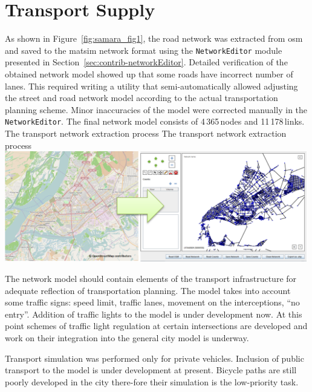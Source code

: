 \section{Transport Supply}
As shown in Figure~\ref{fig:samara_fig1}, the road network was extracted from \gls{osm} and saved to the \gls{matsim} network format using the \lstinline|NetworkEditor| module presented in Section~\ref{sec:contrib-networkEditor}. 
Detailed verification of the obtained network model showed up that some roads have incorrect number of lanes. This required writing a utility that semi-automatically allowed adjusting the street and road network model according to the actual transportation planning scheme. Minor inaccuracies of the model were corrected manually in the \lstinline|NetworkEditor|. The final network model consists of 4\,365\,nodes and 11\,178\,links.
%
\createfigure%
{The transport network extraction process}%
{The transport network extraction process}%
{\label{fig:samara_fig1}}%
{\includegraphics[width=0.99\textwidth, angle=0]{./scenarios/figures/samara_fig1.png}}%
{}

The network model should contain elements of the transport infrastructure for adequate reflection of transportation planning. The model takes into account some traffic signs: speed limit, traffic lanes, movement on the interceptions, ``no entry''. Addition of traffic lights to the model is under development now. At this point schemes of traffic light regulation at certain intersections are developed and work on their integration into the general city model is underway.

Transport simulation was performed only for private vehicles. Inclusion of public transport to the model is under development at present. Bicycle paths are still poorly developed in the city there-fore their simulation is the low-priority task. 

